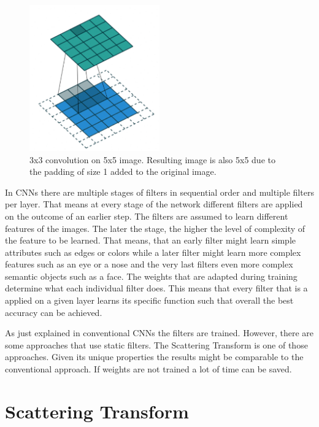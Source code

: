 \begin{figure}[!htb]
	\centering
	\includegraphics[width=0.5\textwidth]{images/convolution.png}
	\caption{3x3 convolution on 5x5 image. Resulting image is also 5x5 due to the padding of size 1 added to the original image. \protect\footnotemark}
	\label{fig:convolution}
\end{figure}


In CNNs there are multiple stages of filters in sequential order and multiple filters per layer. That means at every stage of the network different filters are applied on the outcome of an earlier step. The filters are assumed to learn different features of the images. The later the stage, the higher the level of complexity of the feature to be learned. That means, that an early filter might learn simple attributes such as edges or colors while a later filter might learn more complex features such as an eye or a nose and the very last filters even more complex semantic objects such as a face. The weights that are adapted during training determine what each individual filter does. This means that every filter that is a applied on a given layer learns its specific function such that overall the best accuracy can be achieved. 

As just explained in conventional CNNs the filters are trained. However, there are some approaches that use static filters. The Scattering Transform is one of those approaches. Given its unique properties the results might be comparable to the conventional approach. If weights are not trained a lot of time can be saved. 

\section{Scattering Transform}
\label{sec:scattering_transform}

